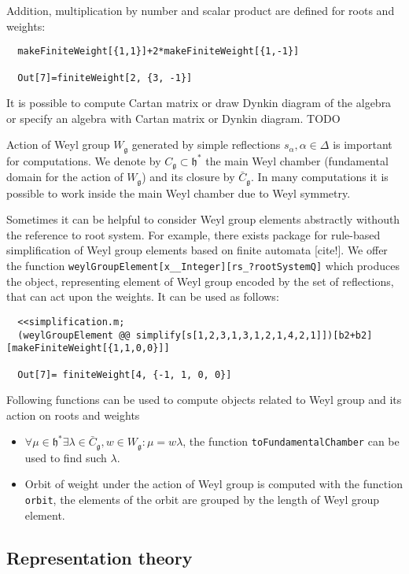 \documentclass[12pt]{article}
\theoremstyle{definition}
\newcommand{\gf}{\mathfrak{g}}
\newcommand{\hf}{\mathfrak{h}}
\begin{document}
Addition, multiplication by number and scalar product are defined for roots and weights:
\begin{lstlisting}
  makeFiniteWeight[{1,1}]+2*makeFiniteWeight[{1,-1}]

  Out[7]=finiteWeight[2, {3, -1}]
\end{lstlisting}

It is possible to compute Cartan matrix or draw Dynkin diagram of the algebra or specify an algebra with Cartan matrix or Dynkin diagram. TODO

Action of Weyl group $W_{\gf}$ generated by simple reflections $s_{\alpha}, \alpha\in \Delta$ is important for computations. We denote by $C_{\gf}\subset \hf^*$ the main Weyl chamber (fundamental domain for the action of $W_{\gf}$) and its closure by $\bar C_{\gf}$. In many computations it is possible to work inside the main Weyl chamber due to Weyl symmetry. 

Sometimes it can be helpful to consider Weyl group elements abstractly withouth the reference to root system. For example, there exists package for rule-based simplification of Weyl group elements based on finite automata [cite!]. We offer the function \lstinline{weylGroupElement[x__Integer][rs_?rootSystemQ]} which produces the object, representing element of Weyl group encoded by the set of reflections, that can act upon the weights. It can be used as follows:
\begin{lstlisting}
  <<simplification.m;
  (weylGroupElement @@ simplify[s[1,2,3,1,3,1,2,1,4,2,1]])[b2+b2][makeFiniteWeight[{1,1,0,0}]]

  Out[7]= finiteWeight[4, {-1, 1, 0, 0}]
\end{lstlisting}


Following functions can be used to compute objects related to Weyl group and its action on roots and weights
 \begin{itemize}
 \item   $\forall \mu\in \hf^* \exists \lambda\in \bar C_{\gf}, w\in W_{\gf}: \mu=w \lambda$, the function \lstinline{toFundamentalChamber} can be used to find such $\lambda$.
 \item Orbit of weight under the action of Weyl group is computed with the function \lstinline{orbit}, the elements of the orbit are grouped by the length of Weyl group element.
 \end{itemize}

\subsection{Representation theory}
\label{sec:repr-theory}
\end{document}
